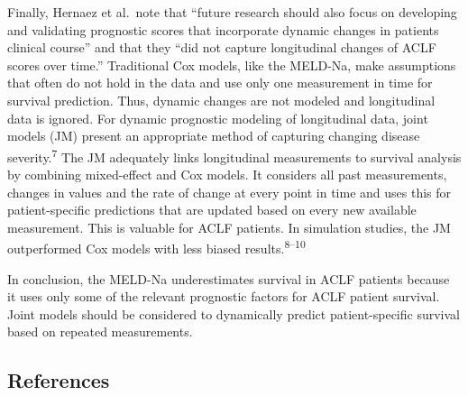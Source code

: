 \documentclass[11pt,english,]{book} %
\begin{document}
Finally, Hernaez et al.~note that ``future research should also focus on developing and validating prognostic scores that incorporate dynamic changes in patients clinical course'' and that they ``did not capture longitudinal changes of ACLF scores over time.'' Traditional Cox models, like the MELD-Na, make assumptions that often do not hold in the data and use only one measurement in time for survival prediction. Thus, dynamic changes are not modeled and longitudinal data is ignored. For dynamic prognostic modeling of longitudinal data, joint models (JM) present an appropriate method of capturing changing disease severity.\textsuperscript{7} The JM adequately links longitudinal measurements to survival analysis by combining mixed-effect and Cox models. It considers all past measurements, changes in values and the rate of change at every point in time and uses this for patient-specific predictions that are updated based on every new available measurement. This is valuable for ACLF patients. In simulation studies, the JM outperformed Cox models with less biased results.\textsuperscript{8--10}

In conclusion, the MELD-Na underestimates survival in ACLF patients because it uses only some of the relevant prognostic factors for ACLF patient survival. Joint models should be considered to dynamically predict patient-specific survival based on repeated measurements.

\linespread{1}
\small

\hypertarget{references-8}{%
\subsection*{References}\label{references-8}}
\end{document}
